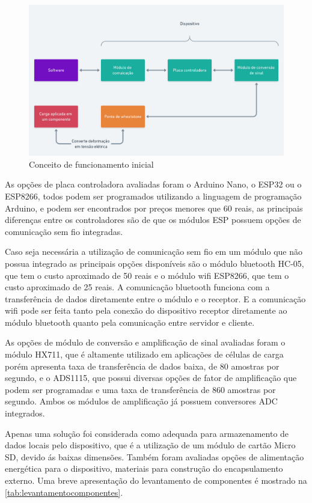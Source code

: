 \begin{figure}[H]
	\caption{\label{fig:2035} Conceito de funcionamento inicial}
	\begin{center}
		\includegraphics[width=\textwidth]{pictures/2035.png}
	\end{center}
\end{figure}

As opções de placa controladora avaliadas foram o Arduino Nano, o ESP32 ou o ESP8266, todos podem ser programados utilizando a linguagem de programação Arduino, e podem ser
encontrados por preços menores que 60 reais, as principais diferenças entre os controladores são de que os módulos ESP possuem opções de comunicação sem fio integradas.

Caso seja necessária a utilização de comunicação sem fio em um módulo que não possua integrado as principais opções disponíveis são o módulo bluetooth HC-05, que tem o custo
aproximado de 50 reais e o módulo wifi ESP8266, que tem o custo aproximado de 25 reais.
A comunicação bluetooth funciona com a transferência de dados diretamente entre o módulo e o receptor.
E a comunicação wifi pode ser feita tanto pela conexão do dispositivo receptor diretamente ao módulo bluetooth quanto pela comunicação entre servidor e cliente.

As opções de módulo de conversão e amplificação de sinal avaliadas foram o módulo HX711, que é altamente utilizado em aplicações de células de carga porém apresenta
taxa de transferência de dados baixa, de 80 amostras por segundo, e o ADS1115, que possui diversas opções de fator de amplificação que podem ser programadas e uma taxa de transferência de 860 amostras
por segundo.
Ambos os módulos de amplificação já possuem conversores ADC integrados.

Apenas uma solução foi considerada como adequada para armazenamento de dados locais pelo dispositivo, que é a utilização de um módulo de cartão Micro SD, devido ás baixas dimensões.
Também foram avaliadas opções de alimentação energética para o dispositivo, materiais para construção do encapsulamento externo.
Uma breve apresentação do levantamento de componentes é mostrado na \autoref{tab:levantamentocomponentes}.

